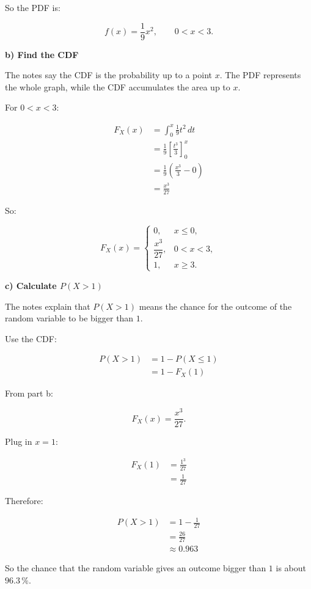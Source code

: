 \documentclass[10pt]{article}
\begin{document}
So the PDF is:

\[
f(x)=\frac{1}{9}x^2,
\qquad 0<x<3.
\]

\textbf{b) Find the CDF}

The notes say the CDF is the probability up to a point $x$.
The PDF represents the whole graph, while the CDF accumulates
the area up to $x$.

For $0<x<3$:

\begin{align*}
F_X(x)
&=
\int_0^x
\frac{1}{9}t^2\,dt \\[2mm]
&=
\frac{1}{9}
\left[
\frac{t^3}{3}
\right]_0^x \\[2mm]
&=
\frac{1}{9}
\left(
\frac{x^3}{3}-0
\right) \\[2mm]
&=
\frac{x^3}{27}
\end{align*}

So:

\[
F_X(x)=
\begin{cases}
0,
& x\leq 0,\\
\dfrac{x^3}{27},
& 0<x<3,\\
1,
& x\geq 3.
\end{cases}
\]

\textbf{c) Calculate $P(X>1)$}

The notes explain that $P(X>1)$ means the chance for the outcome
of the random variable to be bigger than $1$.

Use the CDF:

\begin{align*}
P(X>1)
&=
1-P(X\leq 1) \\[2mm]
&=
1-F_X(1)
\end{align*}

From part b:

\[
F_X(x)=\frac{x^3}{27}.
\]

Plug in $x=1$:

\begin{align*}
F_X(1)
&=
\frac{1^3}{27} \\[2mm]
&=
\frac{1}{27}
\end{align*}

Therefore:

\begin{align*}
P(X>1)
&=
1-\frac{1}{27} \\[2mm]
&=
\frac{26}{27} \\[2mm]
&\approx 0.963
\end{align*}

So the chance that the random variable gives an outcome bigger
than $1$ is about $96.3\,\%$.
\end{document}
